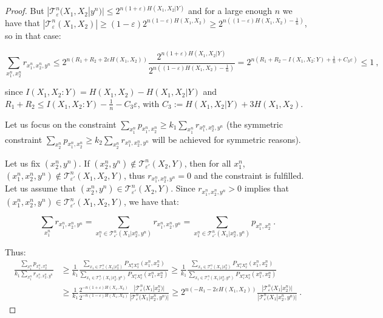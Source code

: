 \documentclass[11pt]{article}
\theoremstyle{definition}
\theoremstyle{remark}
\begin{document}
\begin{proof}
    But $|\mathcal{T}^n_{\varepsilon}(X_1,X_2|y^n)| \leq 2^{n(1+\varepsilon)H(X_1,X_2|Y)}$ and for a large enough $n$ we have that $|\mathcal{T}^n_{\varepsilon}(X_1,X_2)| \geq (1-\varepsilon)2^{n(1-\varepsilon)H(X_1,X_2)} \geq 2^{n\left((1-\varepsilon)H(X_1,X_2) - \frac{1}{n}\right)}$, so in that case:

    \[ \sum_{x_1^n,x_2^n} r_{x_1^n,x_2^n,y^n} \leq 2^{n(R_1+R_2 + 2\varepsilon H(X_1,X_2))}\frac{2^{n(1+\varepsilon)H(X_1,X_2|Y)}}{2^{n\left((1-\varepsilon)H(X_1,X_2) - \frac{1}{n}\right)}} = 2^{n\left(R_1+R_2 - I(X_1,X_2:Y) + \frac{1}{n} + C_3\varepsilon\right)} \leq 1 \ ,\]

    since $I(X_1,X_2:Y) = H(X_1,X_2) - H(X_1,X_2|Y)$ and $R_1+R_2 \leq I(X_1,X_2:Y) - \frac{1}{n} - C_3\varepsilon$, with $C_3 := H(X_1,X_2|Y) + 3H(X_1,X_2)$.

    Let us focus on the constraint $\sum_{x_1^n} p_{x_1^n,x_2^n} \geq k_1 \sum_{x_1^n} r_{x_1^n,x_2^n,y^n}$ (the symmetric constraint $\sum_{x_2^n} p_{x_1^n,x_2^n} \geq k_2 \sum_{x_2^n} r_{x_1^n,x_2^n,y^n}$ will be achieved for symmetric reasons).

    Let us fix $(x_2^n,y^n)$. If $(x_2^n,y^n) \not\in \mathcal{T}^n_{\varepsilon'}(X_2,Y)$, then for all $x_1^n$, $(x_1^n,x_2^n,y^n) \not\in \mathcal{T}^n_{\varepsilon'}(X_1,X_2,Y)$, thus $r_{x_1^n,x_2^n,y^n} = 0$ and the constraint is fulfilled. Let us assume that $(x_2^n,y^n) \in \mathcal{T}^n_{\varepsilon'}(X_2,Y)$. Since $r_{x_1^n,x_2^n,y^n} > 0$ implies that $(x_1^n,x_2^n,y^n) \in \mathcal{T}^n_{\varepsilon'}(X_1,X_2,Y)$, we have that:

    \[ \sum_{x_1^n} r_{x_1^n,x_2^n,y^n} = \sum_{x_1^n \in \mathcal{T}^n_{\varepsilon'}(X_1|x_2^n,y^n)} r_{x_1^n,x_2^n,y^n} = \sum_{x_1^n \in \mathcal{T}^n_{\varepsilon'}(X_1|x_2^n,y^n)} p_{x_1^n,x_2^n} \ .\]
    
    Thus:
     \begin{equation}
      \begin{aligned}
        \frac{\sum_{x_1^n} p_{x_1^n,x_2^n}}{k_1\sum_{x_1^n} r_{x_1^n,x_2^n,y^n}} &\geq \frac{1}{k_1} \frac{ \sum_{x_1 \in \mathcal{T}^n_{\varepsilon}(X_1|x_2^n)}P_{X_1^nX_2^n}(x_1^n,x_2^n)}{\sum_{x_1 \in \mathcal{T}^n_{\varepsilon'}(X_1|x_2^n,y^n)} P_{X_1^nX_2^n}(x_1^n,x_2^n)} \geq \frac{1}{k_1} \frac{ \sum_{x_1 \in \mathcal{T}^n_{\varepsilon}(X_1|x_2^n)}P_{X_1^nX_2^n}(x_1^n,x_2^n)}{\sum_{x_1 \in \mathcal{T}^n_{\varepsilon}(X_1|x_2^n,y^n)} P_{X_1^nX_2^n}(x_1^n,x_2^n)}\\
        &\geq \frac{1}{k_1}\frac{2^{-n(1+\varepsilon)H(X_1,X_2)}}{2^{-n(1-\varepsilon)H(X_1,X_2)}}\frac{|\mathcal{T}^n_{\varepsilon}(X_1|x_2^n)|}{|\mathcal{T}^n_{\varepsilon}(X_1|x_2^n,y^n)|} \geq 2^{n(-R_1-2\varepsilon H(X_1,X_2))}\frac{|\mathcal{T}^n_{\varepsilon}(X_1|x_2^n)|}{|\mathcal{T}^n_{\varepsilon}(X_1|x_2^n,y^n)|}\ .
      \end{aligned}
    \end{equation}


\end{proof}
\end{document}
